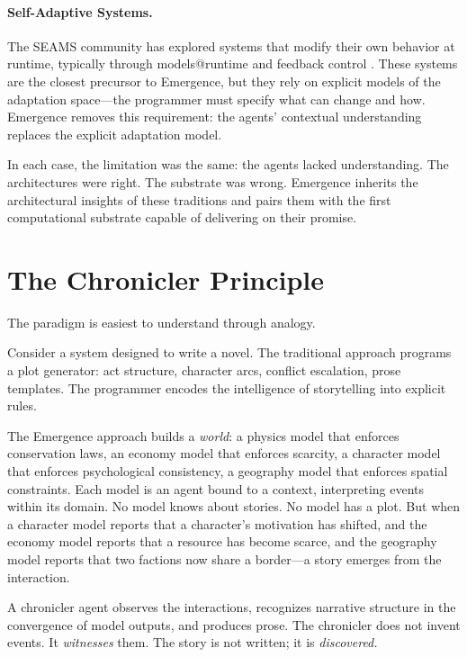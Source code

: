 \documentclass[11pt,twocolumn]{article}
\begin{document}
\paragraph{Self-Adaptive Systems.}  The SEAMS community has explored
systems that modify their own behavior at runtime, typically through
models@runtime and feedback control
\citep{cheng2009software}.  These systems are the closest
precursor to Emergence, but they rely on explicit models of the
adaptation space---the programmer must specify what can change and how.
Emergence removes this requirement: the agents' contextual
understanding replaces the explicit adaptation model.

In each case, the limitation was the same: the agents lacked
understanding.  The architectures were right.  The substrate was wrong.
Emergence inherits the architectural insights of these traditions and
pairs them with the first computational substrate capable of delivering
on their promise.

\section{The Chronicler Principle}
\label{sec:chronicler}

The paradigm is easiest to understand through analogy.

Consider a system designed to write a novel.  The traditional approach
programs a plot generator: act structure, character arcs, conflict
escalation, prose templates.  The programmer encodes the intelligence
of storytelling into explicit rules.

The Emergence approach builds a \emph{world}: a physics model that
enforces conservation laws, an economy model that enforces scarcity, a
character model that enforces psychological consistency, a geography
model that enforces spatial constraints.  Each model is an agent bound
to a context, interpreting events within its domain.  No model knows
about stories.  No model has a plot.  But when a character model reports
that a character's motivation has shifted, and the economy model reports
that a resource has become scarce, and the geography model reports that
two factions now share a border---a story emerges from the interaction.

A chronicler agent observes the interactions, recognizes narrative
structure in the convergence of model outputs, and produces prose.  The
chronicler does not invent events.  It \emph{witnesses} them.  The
story is not written; it is \emph{discovered.}
\end{document}
